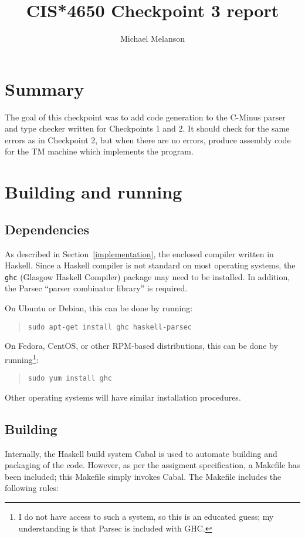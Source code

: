 \documentclass[12pt]{amsart}
\title{CIS*4650 Checkpoint 3 report}
\author{Michael Melanson}
\begin{document}
\maketitle

\section{Summary}
The goal of this checkpoint was to add code generation to the C-Minus
parser and type checker written for Checkpoints 1 and 2. It should
check for the same errors as in Checkpoint 2, but when there are no
errors, produce assembly code for the TM machine which implements the
program.

\section{Building and running}

\subsection{Dependencies}
As described in Section~\ref{implementation}, the enclosed compiler
written in Haskell. Since a Haskell compiler is not standard on most
operating systems, the \verb|ghc| (Glasgow Haskell Compiler) package
may need to be installed. In addition, the Parsec ``parser combinator
library'' is required.

On Ubuntu or Debian, this can be done by running:
\begin{verse}
\verb|sudo apt-get install ghc haskell-parsec|
\end{verse}

On Fedora, CentOS, or other RPM-based distributions, this can be done
by running\footnote{I do not have access to such a system, so this is
  an educated guess; my understanding is that Parsec is included with
  GHC.}:
\begin{verse}
\verb|sudo yum install ghc|
\end{verse}

Other operating systems will have similar installation procedures.

\subsection{Building}
Internally, the Haskell build system Cabal is used to automate
building and packaging of the code. However, as per the assigment
specification, a Makefile has been included; this Makefile simply
invokes Cabal. The Makefile includes the following rules:
\end{document}
